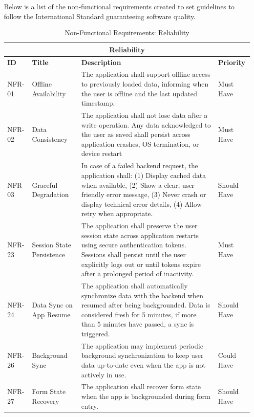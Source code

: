 Below is a list of the non-functional requirements created to set guidelines to follow the International Standard guaranteeing software quality.  


\begin{table}[h]
	\centering
	\caption{Non-Functional Requirements: Reliability}
	\label{tab:nfr-reliability}
	\begin{tabular}{p{2cm}p{4cm}p{7cm}p{2cm}}
		\toprule
		\multicolumn{4}{c}{\textbf{Reliability}}\\
		\midrule
		\textbf{ID} & \textbf{Title} & \textbf{Description} & \textbf{Priority} \\
		\midrule
		NFR-01 & Offline Availability & The application shall support offline access to previously loaded data, informing when the user is offline and the last updated timestamp. & Must Have \\
		\midrule
		NFR-02 & Data Consistency & The application shall not lose data after a write operation. Any data acknowledged to the user as saved shall persist across application crashes, OS termination, or device restart & Must Have \\
		\midrule
		NFR-03 & Graceful Degradation & In case of a failed backend request, the application shall: (1) Display cached data when available, (2) Show a clear, user-friendly error message, (3) Never crash or display technical error details, (4) Allow retry when appropriate. & Should Have \\
		\midrule
		NFR-23 & Session State Persistence & The application shall preserve the user session state across application restarts using secure authentication tokens. Sessions shall persist until the user explicitly logs out or until tokens expire after a prolonged period of inactivity. & Must Have \\
		\midrule
		NFR-24 & Data Sync on App Resume & The application shall automatically synchronize data with the backend when resumed after being backgrounded. Data is considered fresh for 5 minutes, if more than 5 minutes have passed, a sync is triggered. & Should Have \\
		\midrule
		NFR-26 & Background Sync & The application may implement periodic background synchronization to keep user data up-to-date even when the app is not actively in use. & Could Have \\
		\midrule
		NFR-27 & Form State Recovery & The application shall recover form state when the app is backgrounded during form entry. & Should Have \\
		\bottomrule
	\end{tabular}
\end{table}


